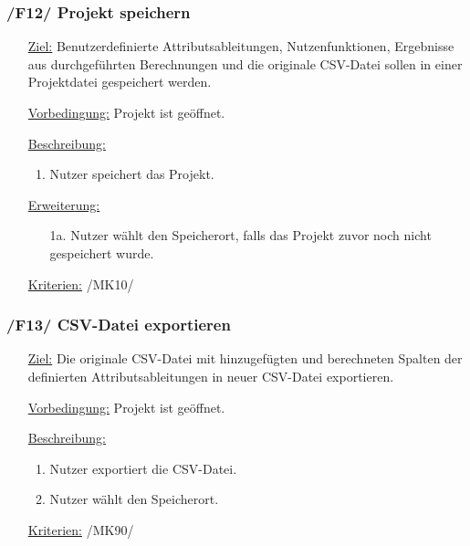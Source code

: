 \documentclass{article}
\begin{document}
\subsubsection*{/F12/ Projekt speichern}
\begin{itemize}
    \item[\underline{Ziel:}] Benutzerdefinierte Attributsableitungen, Nutzenfunktionen, Ergebnisse aus durchgeführten Berechnungen und die originale CSV-Datei sollen in einer Projektdatei gespeichert werden.
    \item[\underline{Vorbedingung:}] Projekt ist geöffnet.
    \item[\underline{Beschreibung:}] 
    \begin{enumerate}
        \item Nutzer speichert das Projekt.
    \end{enumerate}
    \item[\underline{Erweiterung:}]
    \begin{itemize}
        \item[1a.] Nutzer wählt den Speicherort, falls das Projekt zuvor noch nicht gespeichert wurde.
    \end{itemize}
    \item[\underline{Kriterien:}] /MK10/
\end{itemize}

\subsubsection*{/F13/ CSV-Datei exportieren}
\begin{itemize}
    \item[\underline{Ziel:}] Die originale CSV-Datei mit hinzugefügten und berechneten Spalten der definierten Attributsableitungen in neuer CSV-Datei exportieren.
    \item[\underline{Vorbedingung:}] Projekt ist geöffnet.
    \item[\underline{Beschreibung:}] 
    \begin{enumerate}
        \item Nutzer exportiert die CSV-Datei.
        \item Nutzer wählt den Speicherort.
    \end{enumerate}
    \item[\underline{Kriterien:}] /MK90/
\end{itemize}
\end{document}
